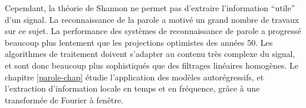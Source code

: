 Cependant, la th\'eorie de Shannon ne permet pas d'extraire
l'information ``utile'' d'un signal.
La reconnaissance de la parole a 
motiv\'e un grand nombre de travaux
sur ce sujet.
La performance des syst\`emes de reconnaissance de parole
a progress\'e beaucoup plus lentement que les 
projections optimistes des ann\'ees 50.
Les algorithmes de traitement doivent
s'adapter au contenu tr\`es complexe du
signal, et sont donc beaucoup plus sophistiqu\'es que des filtrages
lin\'eaires homog\`enes. 
Le chapitre \ref{parole-chap} \'etudie
l'application des mod\`eles autor\'egressifs, et 
l'extraction d'information
locale en temps et en fr\'equence,
gr\^ace \`a une transform\'ee de Fourier \`a fen\^etre.


